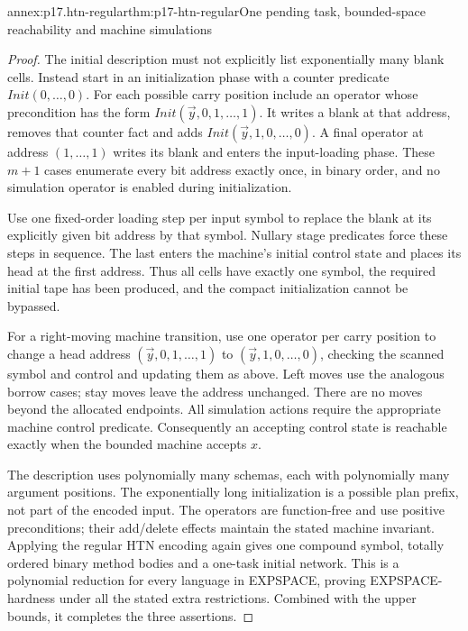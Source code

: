 \begin{annexitem}{annex:p17.htn-regular}{thm:p17-htn-regular}{One pending task, bounded-space reachability and machine simulations}
\begin{proof}
The initial description must not explicitly list exponentially many blank
cells. Instead start in an initialization phase with a counter predicate
\(\mathit{Init}(0,\ldots,0)\). For each possible carry position include
an operator whose precondition has the form
\(\mathit{Init}(\vec y,0,1,\ldots,1)\). It writes a blank at that address,
removes that counter fact and adds
\(\mathit{Init}(\vec y,1,0,\ldots,0)\). A final operator at address
\((1,\ldots,1)\) writes its blank and enters the input-loading phase.
These \(m+1\) cases enumerate every bit address exactly once, in binary
order, and no simulation operator is enabled during initialization.

Use one fixed-order loading step per input symbol to replace the blank at
its explicitly given bit address by that symbol. Nullary stage predicates
force these steps in sequence. The last enters the machine's initial control
state and places its head at the first address. Thus all cells have exactly
one symbol, the required initial tape has been produced, and the compact
initialization cannot be bypassed.

For a right-moving machine transition, use one operator per carry position
to change a head address \((\vec y,0,1,\ldots,1)\) to
\((\vec y,1,0,\ldots,0)\), checking the scanned symbol and control and
updating them as above. Left moves use the analogous borrow cases; stay
moves leave the address unchanged. There are no moves beyond the allocated
endpoints. All simulation actions require the appropriate machine control
predicate. Consequently an accepting control state is reachable exactly
when the bounded machine accepts \(x\).

The description uses polynomially many schemas, each with polynomially
many argument positions. The exponentially long initialization is a possible
plan prefix, not part of the encoded input. The operators are function-free
and use positive preconditions; their add/delete effects maintain the stated
machine invariant. Applying the regular HTN encoding again gives one compound
symbol, totally ordered binary method bodies and a one-task initial network.
This is a polynomial reduction for every language in EXPSPACE, proving
EXPSPACE-hardness under all the stated extra restrictions. Combined with
the upper bounds, it completes the three assertions.
\end{proof}
\end{annexitem}


